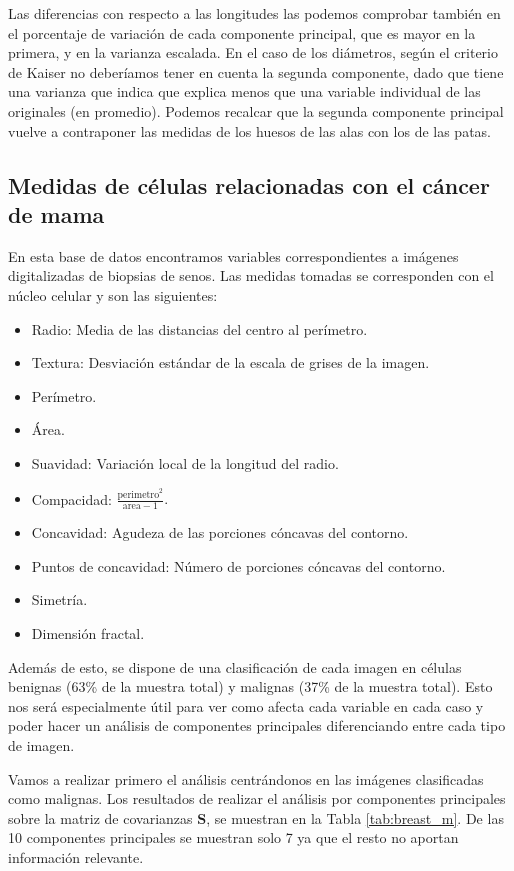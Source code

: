 \documentclass[tfg,cienciasbased,lot,lof,covers,final,overleaf,nocopyright]{tfgtfmthesisuam}
\begin{document}
Las diferencias con respecto a las longitudes las podemos comprobar también en el porcentaje de variación de cada componente principal, que es mayor en la primera, y en la varianza escalada. En el caso de los diámetros, según el criterio de Kaiser no deberíamos tener en cuenta la segunda componente, dado que tiene una varianza que indica que explica menos que una variable individual de las originales (en promedio). Podemos recalcar que la segunda componente principal vuelve a contraponer las medidas de los huesos de las alas con los de las patas. 

\subsection{Medidas de células relacionadas con el cáncer de mama}

En esta base de datos encontramos variables correspondientes a imágenes digitalizadas de biopsias de senos. Las medidas tomadas se corresponden con el núcleo celular y son las siguientes:

\begin{itemize}
    \item Radio: Media de las distancias del centro al perímetro.
    \item Textura: Desviación estándar de la escala de grises de la imagen.
    \item Perímetro.
    \item Área.
    \item Suavidad: Variación local de la longitud del radio.
    \item Compacidad: $\frac{\mathrm{perimetro}^2}{\mathrm{area}-1}.$
    \item Concavidad: Agudeza de las porciones cóncavas del contorno.
    \item Puntos de concavidad: Número de porciones cóncavas del contorno.
    \item Simetría.
    \item Dimensión fractal.
\end{itemize}

Además de esto, se dispone de una clasificación de cada imagen en células benignas (63\% de la muestra total) y malignas (37\% de la muestra total). Esto nos será especialmente útil para ver como afecta cada variable en cada caso y poder hacer un análisis de componentes principales diferenciando entre cada tipo de imagen.

Vamos a realizar primero el análisis centrándonos en las imágenes clasificadas como malignas. Los resultados de realizar el análisis por componentes principales sobre la matriz de covarianzas $\mathbf{S}$, se muestran en la Tabla \ref{tab:breast_m}. De las 10 componentes principales se muestran solo 7 ya que el resto no aportan información relevante.
\end{document}
